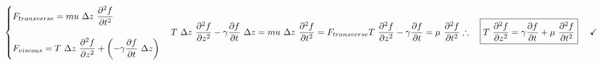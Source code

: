 \documentclass[fleqn]{article}
\begin{document}
\begin{enumerate}
\begin{enumerate}
        \textcolor{hwColor}{
          \\ 
          $
            \begin{cases}
              F_{transverse}=mu ~ \Delta z ~ \dfrac{\partial^2 f}{\partial t^2}
              \\
              \\
              F_{viscous}=T ~ \Delta z ~ \dfrac{\partial^2 f}{\partial z^2}+\left(-\gamma \dfrac{\partial f}{\partial t} ~ \Delta z\right)
            \end{cases}
            \\
            \\
            \\
            T ~ \Delta z ~ \dfrac{\partial^2 f}{\partial z^2}-\gamma \dfrac{\partial f}{\partial t} ~ \Delta z=mu ~ \Delta z ~ \dfrac{\partial^2 f}{\partial t^2}=F_{transverse}
            \\
            \\
            \\
            T ~ \dfrac{\partial^2 f}{\partial z^2}-\gamma \dfrac{\partial f}{\partial t}=\mu ~ \dfrac{\partial^2 f}{\partial t^2}
            \\
            \\
            \\
            \therefore ~~~ \boxed{T ~ \dfrac{\partial^2 f}{\partial z^2}=\gamma \dfrac{\partial f}{\partial t}+\mu ~ \dfrac{\partial^2 f}{\partial t^2}} ~~~~ \checkmark
            \\
            \\
          $
        }







    \end{enumerate}


  \end{enumerate}
\end{document}
